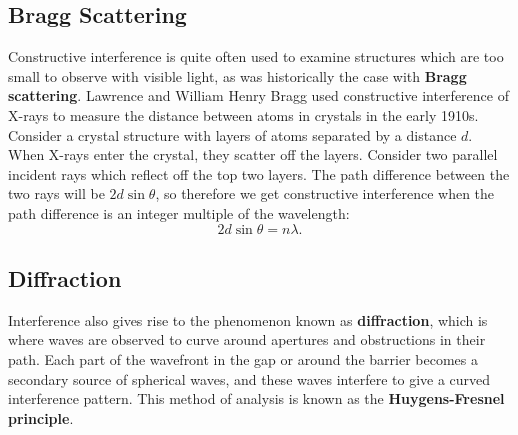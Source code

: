\documentclass[../classical_mechanics.tex]{subfiles}
\begin{document}
        \subsection{Bragg Scattering}\label{subsec:bragg-scattering}
            Constructive interference is quite often used to examine structures which are too small to observe with visible light, as was historically the case with \textbf{Bragg scattering}.
            Lawrence and William Henry Bragg used constructive interference of X-rays to measure the distance between atoms in crystals in the early 1910s.
            Consider a crystal structure with layers of atoms separated by a distance $d$.
            When X-rays enter the crystal, they scatter off the layers.
            Consider two parallel incident rays which reflect off the top two layers.
            The path difference between the two rays will be $2d\sin\theta$, so therefore we get constructive interference when the path difference is an integer multiple of the wavelength:
            \begin{equation}
                2d\sin\theta=n\lambda.
            \end{equation}
        
        \subsection{Diffraction}\label{subsec:diffraction}
            Interference also gives rise to the phenomenon known as \textbf{diffraction}, which is where waves are observed to curve around apertures and obstructions in their path.
            Each part of the wavefront in the gap or around the barrier becomes a secondary source of spherical waves, and these waves interfere to give a curved interference pattern.
            This method of analysis is known as the \textbf{Huygens-Fresnel principle}.
\end{document}
